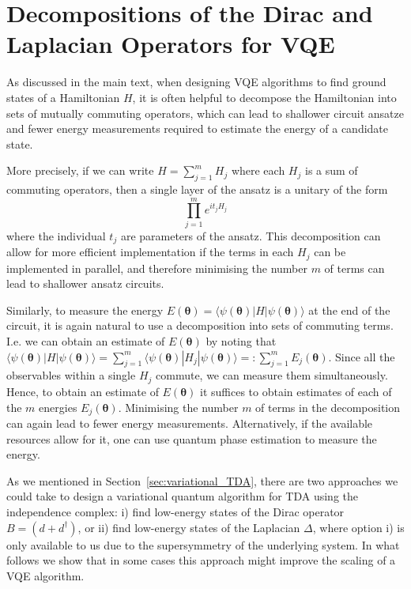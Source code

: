 \documentclass[11pt]{article}
\numberwithin{equation}{section}
\renewcommand\( {\left(}
\renewcommand\) {\right)}
\renewcommand{\braket}[1]{\langle #1 \rangle}
\begin{document}
\section{Decompositions of the Dirac and Laplacian Operators for VQE}\label{app:decompositions}

As discussed in the main text, when designing VQE algorithms to find ground states of a Hamiltonian $H$, it is often helpful to decompose the Hamiltonian into sets of mutually commuting operators, which can lead to shallower circuit ansatze and fewer energy measurements required to estimate the energy of a candidate state.

More precisely, if we can write $H = \sum_{j=1}^m H_j$ where each $H_j$ is a sum of commuting operators, then a single layer of the ansatz is a unitary of the form
\begin{equation}
    \prod_{j=1}^m e^{it_j H_j}
\end{equation}
where the individual $t_j$ are parameters of the ansatz. This decomposition can allow for more efficient implementation if the terms in each $H_j$ can be implemented in parallel, and therefore minimising the number $m$ of terms can lead to shallower ansatz circuits. 

Similarly, to measure the energy $E(\bm\theta) = \braket{\psi(\bm\theta)|H|\psi(\bm\theta)}$ at the end of the circuit, it is again natural to use a decomposition into sets of commuting terms. I.e. we can obtain an estimate of $E(\bm\theta)$ by noting that $\braket{\psi(\bm\theta)|H|\psi(\bm\theta)} = \sum_{j=1}^m \braket{\psi(\bm\theta)|H_j|\psi(\bm\theta)} =: \sum_{j=1}^m E_j(\bm\theta)$. Since all the observables within a single $H_j$ commute, we can measure them simultaneously. Hence, to obtain an estimate of $E(\bm\theta)$ it suffices to obtain estimates of each of the $m$ energies $E_j(\bm\theta)$. Minimising the number $m$ of terms in the decomposition can again lead to fewer energy measurements. Alternatively, if the available resources allow for it, one can use quantum phase estimation to measure the energy. 

As we mentioned in Section~\ref{sec:variational_TDA}, there are two approaches we could take to design a variational quantum algorithm for TDA using the independence complex: i) find low-energy states of the Dirac operator $B = (d+d^\dagger)$, or ii) find low-energy states of the Laplacian $\Delta$, where option i) is only available to us due to the supersymmetry of the underlying system. In what follows we show that in some cases this approach might improve the scaling of a VQE algorithm.
\end{document}
